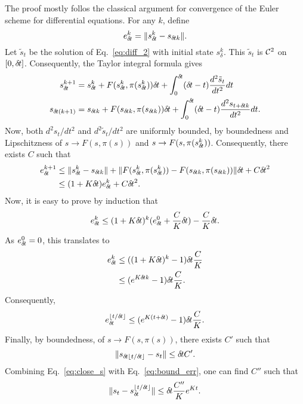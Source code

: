 The proof mostly follos the classical argument for convergence of the
Euler scheme for differential equations.
For any $k$, define
\begin{equation}
	e_{\delta\hspace{-.1em}t}^k = \|s_{\delta\hspace{-.1em}t}^k - s_{{\delta\hspace{-.1em}t} k}\|.
\end{equation}
Let $\tilde s_t$ be the solution of Eq.~\eqref{eq:diff_2} with initial state $s^k_\delta$. This $\tilde s_t$ is ${\cal
C}^2$ on $[0, {\delta\hspace{-.1em}t}]$. Consequently, the Taylor integral formula gives
\begin{align}
	s_{\delta\hspace{-.1em}t}^{k + 1} &= s_{\delta\hspace{-.1em}t}^k + F(s_{\delta\hspace{-.1em}t}^k, \pi(s_{\delta\hspace{-.1em}t}^k)) {\delta\hspace{-.1em}t} +
	\int_{0}^{\delta\hspace{-.1em}t} ({\delta\hspace{-.1em}t} - t) \frac{d^2 \tilde{s}_t}{dt^2} dt\\
	s_{{\delta\hspace{-.1em}t}(k + 1)} &= s_{{\delta\hspace{-.1em}t} k} + F(s_{{\delta\hspace{-.1em}t} k}, \pi(s_{{\delta\hspace{-.1em}t} k})) {\delta\hspace{-.1em}t} +
	\int_0^{\delta\hspace{-.1em}t} ({\delta\hspace{-.1em}t} - t) \frac{d^2 s_{t + {\delta\hspace{-.1em}t} k}}{dt^2} dt.
\end{align}
Now, both $d^2 s_t/dt^2$ and $d^2 \tilde{s}_t/dt^2$ are uniformly bounded, by
boundedness and Lipschitzness of $s \rightarrow F(s, \pi(s))$ and $s
\rightarrow F(s, \pi(s_{\delta\hspace{-.1em}t}^k))$. Consequently, there exists $C$ such that
\begin{align}
	e_{\delta\hspace{-.1em}t}^{k + 1} &\leq \|s_{\delta\hspace{-.1em}t}^k - s_{{\delta\hspace{-.1em}t} k}\| + \|F(s_{\delta\hspace{-.1em}t}^k, \pi(s_{\delta\hspace{-.1em}t}^k)) - F(s_{{\delta\hspace{-.1em}t} k}, \pi(s_{{\delta\hspace{-.1em}t} k}))\| {\delta\hspace{-.1em}t} + C {\delta\hspace{-.1em}t}^2\\
			  &\leq (1 + K {\delta\hspace{-.1em}t}) e_{\delta\hspace{-.1em}t}^k + C {\delta\hspace{-.1em}t}^2.
\end{align}
Now, it is easy to prove by induction that
\begin{equation}
	e_{\delta\hspace{-.1em}t}^k \leq (1 + K {\delta\hspace{-.1em}t})^k (e_{\delta\hspace{-.1em}t}^0 + \frac{C}{K} {\delta\hspace{-.1em}t}) - \frac{C}{K}{\delta\hspace{-.1em}t}.
\end{equation}
As $e_{\delta\hspace{-.1em}t}^0 = 0$, this translates to
\begin{align}
	e_{\delta\hspace{-.1em}t}^k &\leq ((1 + K {\delta\hspace{-.1em}t})^k - 1) {\delta\hspace{-.1em}t} \frac{C}{K}\\
		    &\leq (e^{K {\delta\hspace{-.1em}t} k} - 1) {\delta\hspace{-.1em}t} \frac{C}{K}.
\end{align}
Consequently,
\begin{equation}
	e_{\delta\hspace{-.1em}t}^{\lfloor t / {\delta\hspace{-.1em}t} \rfloor} \leq (e^{K(t + {\delta\hspace{-.1em}t})} - 1) {\delta\hspace{-.1em}t} \frac{C}{K}.
	\label{eq:bound_err}
\end{equation}
Finally, by boundedness, of $s \rightarrow F(s, \pi(s))$, there exists $C'$ such that
\begin{equation}
	\|s_{{\delta\hspace{-.1em}t}\lfloor t / {\delta\hspace{-.1em}t} \rfloor} - s_t \| \leq {\delta\hspace{-.1em}t} C'.
	\label{eq:close_s}
\end{equation}
Combining Eq.~\eqref{eq:close_s} with Eq.~\eqref{eq:bound_err}, one can find $C''$ such that
\begin{equation}
	\|s_t - s_{\delta\hspace{-.1em}t}^{\lfloor t / {\delta\hspace{-.1em}t} \rfloor}\| \leq {\delta\hspace{-.1em}t} \frac{C''}{K} e^{Kt}.
\end{equation}
